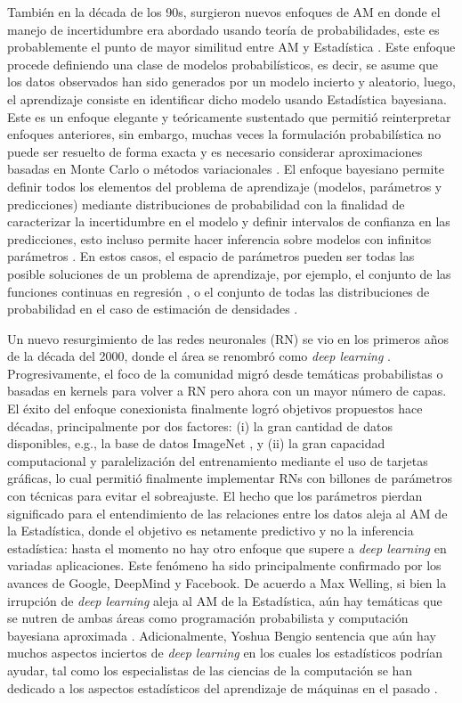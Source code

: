 También en la década de los 90s, surgieron nuevos enfoques de AM en donde el manejo de incertidumbre era abordado usando teoría de probabilidades, este es probablemente el punto de mayor similitud entre AM y Estadística \cite{ghahramani_2015}. Este enfoque procede definiendo una clase de modelos probabilísticos, es decir, se asume que los datos observados han sido generados por un modelo incierto y aleatorio, luego, el aprendizaje consiste en identificar dicho modelo usando Estadística bayesiana. Este es un enfoque elegante y teóricamente sustentado que permitió reinterpretar enfoques anteriores, sin embargo, muchas veces la formulación probabilística no puede ser resuelto de forma exacta y es necesario considerar aproximaciones basadas en Monte Carlo \cite{neal_1993} o métodos variacionales \cite{jordan_1999}. El enfoque bayesiano permite definir todos los elementos del problema de aprendizaje (modelos, parámetros y predicciones) mediante distribuciones de probabilidad con la finalidad de caracterizar la incertidumbre en el modelo y definir intervalos de confianza en las predicciones, esto incluso permite hacer inferencia sobre modelos con infinitos parámetros \cite{hjort_2010}. En estos casos, el espacio de parámetros pueden ser todas las posible soluciones de un problema de aprendizaje, por ejemplo, el conjunto de las funciones continuas en regresión \cite{rasmussen_2006}, o el conjunto de todas las distribuciones de probabilidad en el caso de estimación de densidades \cite{ferguson_1973}.

Un nuevo resurgimiento de las redes neuronales (RN) se vio en los primeros años de la década del 2000, donde el área se renombró como \emph{deep learning} \cite{bengio_2009}. Progresivamente, el foco de la comunidad migró desde temáticas probabilistas o basadas en kernels para volver a RN pero ahora con un mayor número de capas. El éxito del enfoque conexionista finalmente logró objetivos propuestos hace décadas, principalmente por dos factores: (i) la gran cantidad de datos disponibles, e.g., la base de datos ImageNet \cite{imagenet_cvpr09}, y (ii) la gran capacidad computacional y paralelización del entrenamiento mediante el uso de tarjetas gráficas, lo cual permitió finalmente implementar RNs con billones de parámetros con técnicas para evitar el sobreajuste. El hecho que los parámetros pierdan significado para el entendimiento de las relaciones entre los datos aleja al AM de la Estadística, donde el objetivo es netamente predictivo y no la inferencia estadística: hasta el momento no hay otro enfoque que supere a \emph{deep learning} en variadas aplicaciones. Este fenómeno ha sido principalmente confirmado por los avances de Google, DeepMind y Facebook. De acuerdo a Max Welling, si bien la irrupción de \emph{deep learning} aleja al AM de la Estadística, aún hay temáticas que se nutren de ambas áreas como programación probabilista y computación bayesiana aproximada \cite{welling_2015}. Adicionalmente, Yoshua Bengio sentencia que aún hay muchos aspectos inciertos de \emph{deep learning} en los cuales los estadísticos podrían ayudar, tal como los especialistas de las ciencias de la computación se han dedicado a los aspectos estadísticos del aprendizaje de máquinas en el pasado \cite{bengio_2016}. 
 

